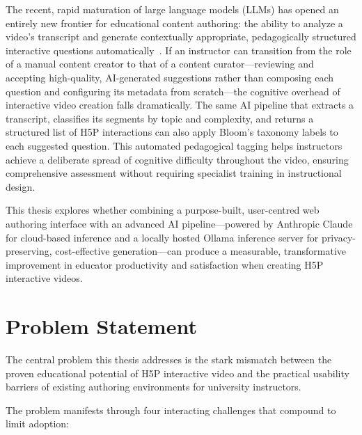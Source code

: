 The recent, rapid maturation of large language models (LLMs) has opened an entirely new frontier for educational content authoring: the ability to analyze a video's transcript and generate contextually appropriate, pedagogically structured interactive questions automatically~\cite{brown2020,anthropic2024}. If an instructor can transition from the role of a manual content creator to that of a content curator—reviewing and accepting high-quality, AI-generated suggestions rather than composing each question and configuring its metadata from scratch—the cognitive overhead of interactive video creation falls dramatically. The same AI pipeline that extracts a transcript, classifies its segments by topic and complexity, and returns a structured list of H5P interactions can also apply Bloom's taxonomy labels to each suggested question. This automated pedagogical tagging helps instructors achieve a deliberate spread of cognitive difficulty throughout the video, ensuring comprehensive assessment without requiring specialist training in instructional design.

This thesis explores whether combining a purpose-built, user-centred web authoring interface with an advanced AI pipeline—powered by Anthropic Claude for cloud-based inference and a locally hosted Ollama inference server for privacy-preserving, cost-effective generation—can produce a measurable, transformative improvement in educator productivity and satisfaction when creating H5P interactive videos.

\section{Problem Statement}

The central problem this thesis addresses is the stark mismatch between the proven educational potential of H5P interactive video and the practical usability barriers of existing authoring environments for university instructors.

The problem manifests through four interacting challenges that compound to limit adoption:


